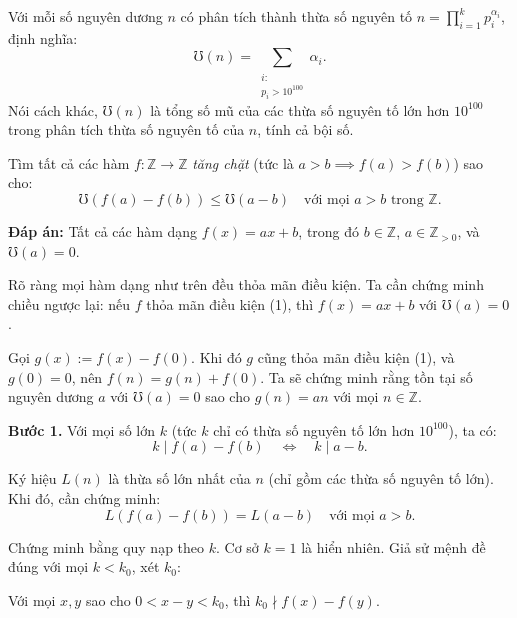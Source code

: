 \ifshowproblemandsoln
\ifshowproblem\begin{problem}\label{problem:IMO-2015-SL-P8}\fi
\ifshowsoln\begin{problem}\fi
    Với mỗi số nguyên dương \( n \) có phân tích thành thừa số nguyên tố \( n = \prod_{i = 1}^{k} p_i^{\alpha_i} \), định nghĩa:
    \[
        \mho(n) = \sum_{\substack{i:\\ p_i > 10^{100}}} \alpha_i.
    \]
    Nói cách khác, \( \mho(n) \) là tổng số mũ của các thừa số nguyên tố lớn hơn \( 10^{100} \)
    trong phân tích thừa số nguyên tố của \( n \), tính cả bội số.
    
    Tìm tất cả các hàm \( f: \mathbb{Z} \to \mathbb{Z} \) \textit{tăng chặt} (tức là \( a > b \implies f(a) > f(b) \)) sao cho:
    \[
        \mho(f(a) - f(b)) \le \mho(a - b) \quad \text{với mọi } a > b \text{ trong } \mathbb{Z}.
    \]    
\end{problem}
\fi

\ifshowsoln
\begin{soln}\footnotemark
    \textbf{Đáp án:} Tất cả các hàm dạng \( f(x) = ax + b \), trong đó \( b \in \mathbb{Z} \), \( a \in \mathbb{Z}_{>0} \), và \( \mho(a) = 0 \).

    Rõ ràng mọi hàm dạng như trên đều thỏa mãn điều kiện. Ta cần chứng minh chiều ngược lại:
    nếu \( f \) thỏa mãn điều kiện (1), thì \( f(x) = ax + b \) với \( \mho(a) = 0 \).

    Gọi \( g(x) := f(x) - f(0) \). Khi đó \( g \) cũng thỏa mãn điều kiện (1), và \( g(0) = 0 \), nên \( f(n) = g(n) + f(0) \).
    Ta sẽ chứng minh rằng tồn tại số nguyên dương \( a \) với \( \mho(a) = 0 \) sao cho \( g(n) = an \) với mọi \( n \in \mathbb{Z} \).

    \textbf{Bước 1.} Với mọi số lớn \( k \) (tức \( k \) chỉ có thừa số nguyên tố lớn hơn \( 10^{100} \)), ta có:
    \[
        k \mid f(a) - f(b) \quad \Leftrightarrow \quad k \mid a - b.
    \]

    Ký hiệu \( L(n) \) là thừa số lớn nhất của \( n \) (chỉ gồm các thừa số nguyên tố lớn). Khi đó, cần chứng minh:
    \[
        L(f(a) - f(b)) = L(a - b) \quad \text{với mọi } a > b.
    \]

    Chứng minh bằng quy nạp theo \( k \). Cơ sở \( k = 1 \) là hiển nhiên. Giả sử mệnh đề đúng với mọi \( k < k_0 \), xét \( k_0 \):

    \begin{claim*}
        Với mọi \( x, y \) sao cho \( 0 < x - y < k_0 \), thì \( k_0 \nmid f(x) - f(y) \).
    \end{claim*}


\end{soln}
\end{problem}
